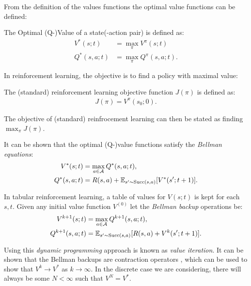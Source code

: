     From the definition of the values functions the optimal value functions can be defined:
    \begin{defn}
        \label{def:optimal_value}
        \label{def:optimal_q_value}
        The \textnormal{Optimal (Q-)Value} of a state(-action pair) is defined as:
        \begin{align}
            V^*(s;t) &= \max_{\pi} V^{\pi}(s;t) \\
            Q^*(s,a;t) &= \max_{\pi} Q^{\pi}(s,a;t).
        \end{align}
    \end{defn}

    In reinforcement learning, the objective is to find a policy with maximal value:
    \begin{defn}
        The \textnormal{(standard) reinforcement learning objective function} $J(\pi)$ is defined as:
        \begin{align}
            J(\pi) = V^{\pi}(s_0;0).
        \end{align}

        The objective of (standard) reinfrocement learning can then be stated as finding $\max_{\pi} J(\pi)$.
    \end{defn}

    It can be shown  that the optimal (Q-)value functions satisfy the \textit{Bellman equations}:
    \begin{align}
        V^*(s;t) &= \max_{a\in\mathcal{A}} Q^*(s,a;t), \\
        Q^*(s,a;t) &= R(s,a) + \mathbb{E}_{s'\sim \textnormal{Succ}(s,a)} [V^*(s';t+1)].
    \end{align} 

    In tabular reinforcement learning, a table of values for $V(s;t)$  is kept for each $s,t$. Given any initial value function $V^{(0)}$ let the \textit{Bellman backup} operations be:
    \begin{align}
        V^{k+1}(s;t) &= \max_{a\in\mathcal{A}} Q^{k+1}(s,a;t), \\
        Q^{k+1}(s,a;t) &= \mathbb{E}_{s'\sim \textnormal{Succ}(s,a)} [R(s,a) + V^k(s';t+1)].
    \end{align}

    Using this \textit{dynamic programming} approach is known as \textit{value iteration}. It can be shown that the Bellman backups are contraction operators , which can be used to show that $V^{k}\rightarrow V^*$ as $k\rightarrow \infty$. In the discrete  case we are considering, there will always be some $N<\infty$ such that $V^{N}=V^*$.

